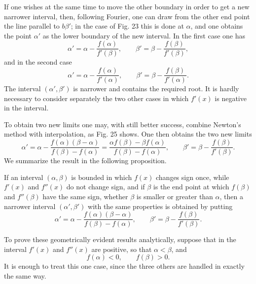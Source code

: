 \documentclass[11pt]{article}
\begin{document}
If one wishes at the same time to move the other boundary in order to get a new narrower interval, then, following Fourier, one can draw from the other end point the line parallel to $b\beta'$; in the case of Fig. 23 this is done at $\alpha$, and one obtains the point $\alpha'$ as the lower boundary of the new interval. In the first case one has
\[
        \alpha'=\alpha-\frac{f(\alpha)}{f'(\beta)},\qquad
        \beta'=\beta-\frac{f(\beta)}{f'(\beta)},
\]
and in the second case
\[
        \alpha'=\alpha-\frac{f(\alpha)}{f'(\alpha)},\qquad
        \beta'=\beta-\frac{f(\beta)}{f'(\alpha)}.
\]
The interval $(\alpha',\beta')$ is narrower and contains the required root. It is hardly necessary to consider separately the two other cases in which $f'(x)$ is negative in the interval.

\weberfigtwentyfive

To obtain two new limits one may, with still better success, combine Newton's method with interpolation, as Fig. 25 shows. One then obtains the two new limits
\[
        \alpha'=\alpha-\frac{f(\alpha)(\beta-\alpha)}{f(\beta)-f(\alpha)}
        =\frac{\alpha f(\beta)-\beta f(\alpha)}{f(\beta)-f(\alpha)},
        \qquad
        \beta'=\beta-\frac{f(\beta)}{f'(\beta)}.
\]
We summarize the result in the following proposition.

If an interval $(\alpha,\beta)$ is bounded in which $f(x)$ changes sign once, while $f'(x)$ and $f''(x)$ do not change sign, and if $\beta$ is the end point at which $f(\beta)$ and $f''(\beta)$ have the same sign, whether $\beta$ is smaller or greater than $\alpha$, then a narrower interval $(\alpha',\beta')$ with the same properties is obtained by putting
\begin{equation}
        \alpha'=\alpha-\frac{f(\alpha)(\beta-\alpha)}{f(\beta)-f(\alpha)},
        \qquad
        \beta'=\beta-\frac{f(\beta)}{f'(\beta)}.
\tag{4}
\end{equation}

To prove these geometrically evident results analytically, suppose that in the interval $f'(x)$ and $f''(x)$ are positive, so that $\alpha<\beta$, and
\[
        f(\alpha)<0,\qquad f(\beta)>0.
\]
It is enough to treat this one case, since the three others are handled in exactly the same way.
\end{document}
